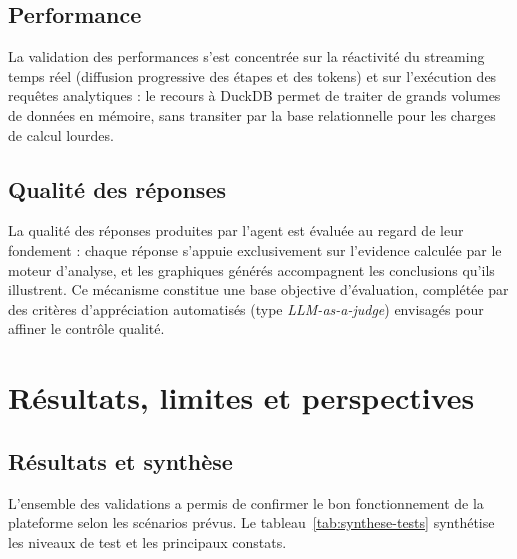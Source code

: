 \subsection{Performance}

La validation des performances s'est concentrée sur la réactivité du streaming temps réel (diffusion progressive des étapes et des tokens) et sur l'exécution des requêtes analytiques : le recours à DuckDB permet de traiter de grands volumes de données en mémoire, sans transiter par la base relationnelle pour les charges de calcul lourdes.

\subsection{Qualité des réponses}

La qualité des réponses produites par l'agent est évaluée au regard de leur fondement : chaque réponse s'appuie exclusivement sur l'evidence calculée par le moteur d'analyse, et les graphiques générés accompagnent les conclusions qu'ils illustrent. Ce mécanisme constitue une base objective d'évaluation, complétée par des critères d'appréciation automatisés (type \textit{LLM-as-a-judge}) envisagés pour affiner le contrôle qualité.

\section{Résultats, limites et perspectives}

\subsection{Résultats et synthèse}

L'ensemble des validations a permis de confirmer le bon fonctionnement de la plateforme selon les scénarios prévus. Le tableau~\ref{tab:synthese-tests} synthétise les niveaux de test et les principaux constats.

